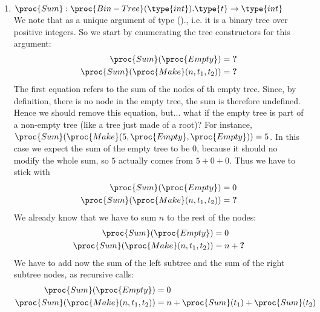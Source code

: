 \begin{enumerate}
     \item \(\proc{Sum}: \proc{Bin-Tree}(\type{int}).\type{t}
       \rightarrow \type{int}\)\\ We note that  as a unique
       argument of type ()., i.e. it
       is a binary tree over positive integers. So we start by
       enumerating the tree constructors for this argument:
     \begin{align*}
       \proc{Sum} (\proc{Empty}) &= \textbf{?}\\
       \proc{Sum} (\proc{Make} (n, t_1, t_2)) &= \textbf{?}
     \end{align*}
     The first equation refers to the sum of the nodes of th empty
     tree. Since, by definition, there is no node in the empty tree,
     the sum is therefore undefined. Hence we should remove this
     equation, but... what if the empty tree is part of a non-empty
     tree (like a tree just made of a root)? For instance,
     \(\proc{Sum} (\proc{Make} (5, \proc{Empty}, \proc{Empty})) =
     5\). In this case we expect the sum of the empty tree to be
     \(0\), because it should no modify the whole sum, so \(5\)
     actually comes from \(5 + 0 + 0\). Thus we have to stick with
     \begin{align*}
       \proc{Sum} (\proc{Empty}) &= 0\\
       \proc{Sum} (\proc{Make} (n, t_1, t_2)) &= \textbf{?}
     \end{align*}
     We already know that we have to sum \(n\) to the rest of
       the nodes:
     \begin{align*}
       \proc{Sum} (\proc{Empty}) &= 0\\
       \proc{Sum} (\proc{Make} (n, t_1, t_2)) &= n + \textbf{?}
     \end{align*}
     We have to add now the sum of the left subtree and the sum of the
     right subtree nodes, as recursive calls:
     \begin{align*}
       \proc{Sum} (\proc{Empty}) &= 0\\
       \proc{Sum} (\proc{Make} (n, t_1, t_2)) &= n + \proc{Sum} (t_1)
       + \proc{Sum} (t_2)
     \end{align*}

\end{enumerate}
